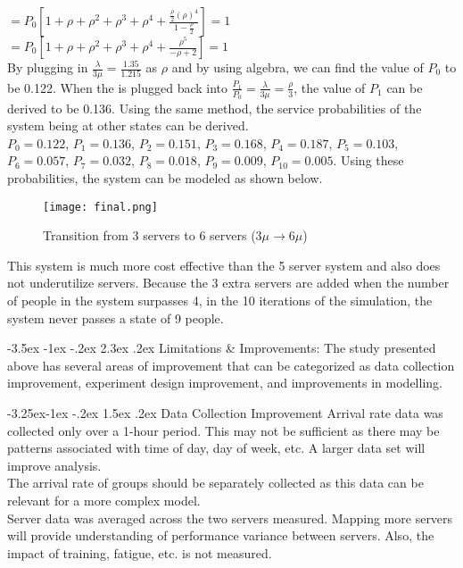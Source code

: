 \documentclass[11pt]{article}
\makeatletter
\renewcommand\section{\@startsection {section}{1}{\z@}%
                                       {-3.5ex \@plus -1ex \@minus -.2ex}%
                                       {2.3ex \@plus.2ex}%
                                       {\normalfont\fontfamily{phv}\fontsize{16}{19}\bfseries}}
\renewcommand\subsection{\@startsection{subsection}{2}{\z@}%
                                         {-3.25ex\@plus -1ex \@minus -.2ex}%
                                         {1.5ex \@plus .2ex}%
                                         {\normalfont\fontfamily{phv}\fontsize{14}{17}\bfseries}}
\makeatother
\begin{document}
$= P_0[1+\rho+\rho^2+\rho^3+\rho^4+\frac{\frac{\rho}{2}(\rho)^4}{1-\frac{\rho}{2}}] = 1$\\
$= P_0[1+\rho+\rho^2+\rho^3+\rho^4+\frac{\rho^5}{-\rho+2}] = 1$\\
By plugging in $\frac{\lambda}{3\mu} = \frac{1.35}{1.215}$ as $\rho$ and by using algebra, we can find the value of $P_0$ to be 0.122. When the is plugged back into $\frac{P_1}{P_0} = \frac{\lambda}{3\mu} = \frac{\rho}{3}$, the value of $P_1$ can be derived to be 0.136. Using the same method, the service probabilities of the system being at other states can be derived.\\
$P_0 = 0.122$, $P_1 = 0.136$, $P_2 = 0.151$, $P_3 = 0.168$, $P_4 = 0.187$, $P_5 = 0.103$, $P_6 = 0.057$, $P_7 = 0.032$, $P_8 = 0.018$, $P_9 = 0.009$, $P_{10} = 0.005$. Using these probabilities, the system can be modeled as shown below. 

\begin{figure}[h!]
    \centering
    \texttt{[image: final.png]}
    \caption{Transition from 3 servers to 6 servers ($3\mu \xrightarrow{} 6\mu$)}
    \label{final}
\end{figure}
\FloatBarrier
This system is much more cost effective than the 5 server system and also does not underutilize servers. Because the 3 extra servers are added when the number of people in the system surpasses 4, in the 10 iterations of the simulation, the system never passes a state of 9 people. 

\section{Limitations \& Improvements:} \label{s:numerical}
The study presented above has several areas of improvement that can be categorized as data collection
improvement, experiment design improvement, and improvements in modelling.

\subsection{Data Collection Improvement}
 Arrival rate data was collected only over a 1-hour period. This may not be sufficient as there may be patterns associated with time of day, day of week, etc. A larger data set will improve analysis.\\
 The arrival rate of groups should be separately collected as this data can be relevant for a more complex model.\\
 Server data was averaged across the two servers measured. Mapping more servers will provide understanding of performance variance between servers. Also, the impact of training, fatigue, etc. is not measured.
\end{document}
